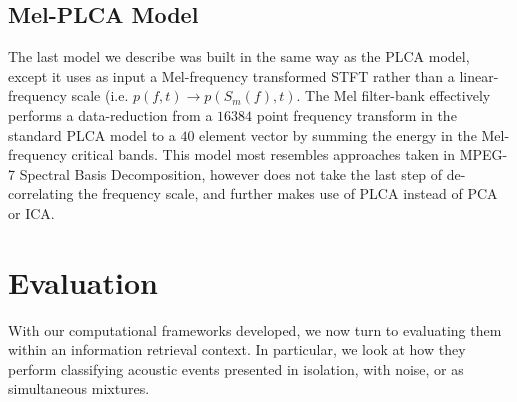 \documentclass[a4paper,10pt,final]{ThesisStyle}
\begin{document}

\subsection{Mel-PLCA Model}

The last model we describe was built in the same way as the PLCA model, except it uses as input a Mel-frequency transformed STFT rather than a linear-frequency scale (i.e. $p(f,t) \rightarrow p(S_m(f),t)$.  The Mel filter-bank effectively performs a data-reduction from a $16384$ point frequency transform in the standard PLCA model to a $40$ element vector by summing the energy in the Mel-frequency critical bands.  This model most resembles approaches taken in MPEG-7 Spectral Basis Decomposition, however does not take the last step of de-correlating the frequency scale, and further makes use of PLCA instead of PCA or ICA.  %

\section{Evaluation}

With our computational frameworks developed, we now turn to evaluating them within an information retrieval context.  In particular, we look at how they perform classifying acoustic events presented in isolation, with noise, or as simultaneous mixtures.


\end{document}
